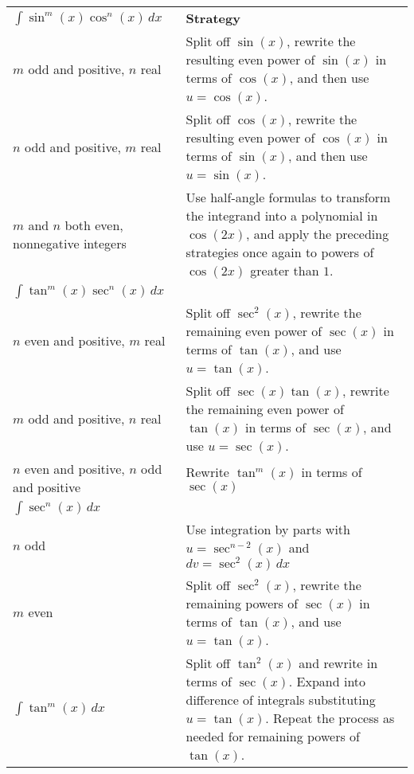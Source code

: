 \documentclass[../mathNotesPreamble]{subfiles}
\begin{document}
  \begin{center}
    \renewcommand{\arraystretch}{1.65}
    \begin{tabularx}{\linewidth}{@{}
      >{\hsize=0.65\hsize}X
      >{\hsize=1.35\hsize}X
      @{}}\toprule
      $\displaystyle \int \sin^m(x)\cos^n(x)\,dx$& \textbf{Strategy}\\
      $m$ odd and positive, $n$ real& 
      Split off $\sin(x)$, rewrite the resulting even power of $\sin(x)$ in terms of $\cos(x)$, and then use $u=\cos(x)$.\\
      $n$ odd and positive, $m$ real& 
      Split off $\cos(x)$, rewrite the resulting even power of $\cos(x)$ in terms of $\sin(x)$, and then use $u=\sin(x)$.\\
      $m$ and $n$ both even, nonnegative integers&
      Use half-angle formulas to transform the integrand into a polynomial in $\cos(2x)$, and apply the preceding strategies once again to powers of $\cos(2x)$ greater than $1$.\\
      \midrule
      $\displaystyle \int \tan^m(x)\sec^n(x)\,dx$\\
      $n$ even and positive, $m$ real& 
      Split off $\sec^2(x)$, rewrite the remaining even power of $\sec(x)$ in terms of $\tan(x)$, and use $u=\tan(x)$.\\
      $m$ odd and positive, $n$ real&
      Split off $\sec(x)\tan(x)$, rewrite the remaining even power of $\tan(x)$ in terms of $\sec(x)$, and use $u=\sec(x)$.\\
      $n$ even and positive, $n$ odd and positive&
      Rewrite $\tan^m(x)$ in terms of $\sec(x)$\\\midrule
      $\displaystyle \int \sec^n(x)\,dx$\\
      $n$ odd&
      Use integration by parts with $u=\sec^{n-2}(x)$ and \newline$dv=\sec^2(x)\,dx$\\
      $m$ even&
      Split off $\sec^2(x)$, rewrite the remaining powers of $\sec(x)$ in terms of $\tan(x)$, and use $u=\tan(x)$.\\\midrule
      $\displaystyle \int \tan^m(x)\,dx$&
      Split off $\tan^2(x)$ and rewrite in terms of $\sec(x)$. Expand into difference of integrals substituting $u=\tan(x)$. Repeat the process as needed for remaining powers of $\tan(x)$.\\
      \bottomrule
    \end{tabularx}
  \end{center}
  \pagebreak
\end{document}
